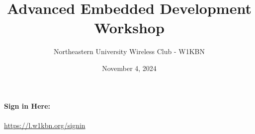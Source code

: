 \documentclass{beamer}
\title{Advanced Embedded Development Workshop}
\author{Northeastern University Wireless Club - W1KBN}
\date{November 4, 2024}
\begin{document}
\begin{frame}
    \titlepage %
    \vspace{-1cm} %
    \begin{center}
        \textbf{Sign in Here:} \\ %
        \\
        {\small \url{https://l.w1kbn.org/signin}} %
    \end{center}
\end{frame}
\end{document}
